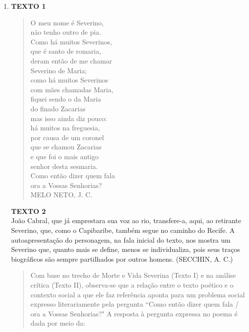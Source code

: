 \documentclass[10pt,a4paper]{article}
\begin{document}
\begin{multicols}{2}
\begin{enumerate}
	\item \textbf{TEXTO 1}
	\begin{quote}
		O meu nome \'e Severino,\\
		n\~ao tenho outro de pia.\\
		Como h\'a muitos Severinos,\\
		que \'e santo de romaria,\\
		deram ent\~ao de me chamar\\
		Severino de Maria;\\
		como h\'a muitos Severinos\\
		com m\~aes chamadas Maria,\\
		fiquei sendo o da Maria\\
		do finado Zacarias\\
		mas isso ainda diz pouco:\\
		h\'a muitos na freguesia,\\
		por causa de um coronel\\
		que se chamou Zacarias\\
		e que foi o mais antigo\\
		senhor desta sesmaria.\\
		Como ent\~ao dizer quem fala\\
		ora a Vossas Senhorias?\\
		MELO NETO, J. C.
	\end{quote}
	\textbf{TEXTO 2} \\
	Jo\~ao Cabral, que j\'a emprestara sua voz ao rio, transfere-a, aqui, ao retirante Severino, que, como o Capibaribe, tamb\'em segue no caminho do Recife. A autoapresenta\c{c}\~ao do personagem, na fala inicial do texto, nos mostra um Severino que, quanto mais se define, menos se individualiza, pois seus tra\c{c}os biogr\'aficos s\~ao sempre partilhados por outros homens. (SECCHIN, A. C.)
	\begin{quote}
	Com base no trecho de Morte e Vida Severina (Texto I) e na an\'alise cr\'itica (Texto II), observa-se que a rela\c{c}\~ao entre o texto po\'etico e o contexto social a que ele faz refer\^encia aponta para um problema social expresso literariamente pela pergunta ``Como ent\~ao dizer quem fala / ora a Vossas Senhorias?" A resposta \`a pergunta expressa no poema \'e dada por meio da:


\end{quote}
\end{enumerate}
\end{multicols}
\end{document}
